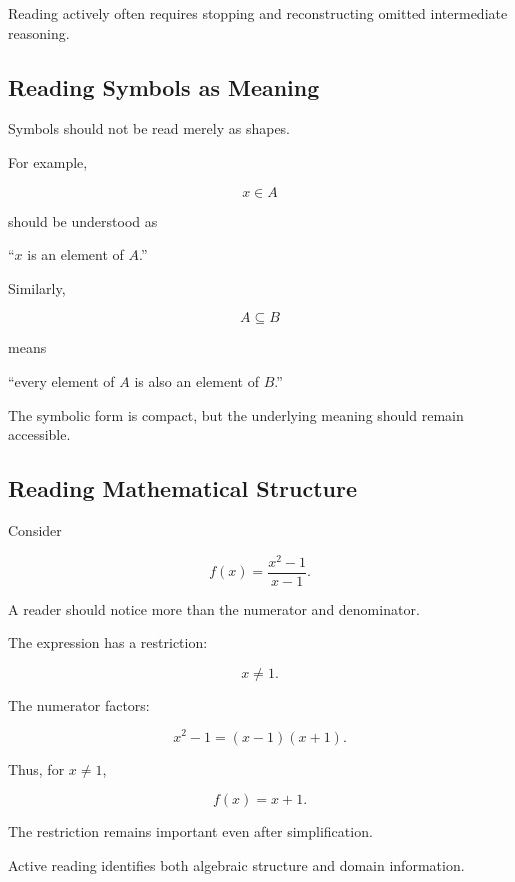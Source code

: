 Reading actively often requires stopping and reconstructing omitted
intermediate reasoning.

\subsection{Reading Symbols as Meaning}
\label{subsec:reading-symbols-as-meaning}

Symbols should not be read merely as shapes.

For example,

\[ x\in A \]

should be understood as

\begin{center}
``\(x\) is an element of \(A\).''
\end{center}

Similarly,

\[ A\subseteq B \]

means

\begin{center}
``every element of \(A\) is also an element of \(B\).''
\end{center}

The symbolic form is compact, but the underlying meaning should remain
accessible.

\subsection{Reading Mathematical Structure}
\label{subsec:reading-mathematical-structure}

Consider

\[ f(x)=\frac{x^2-1}{x-1}. \]

A reader should notice more than the numerator and denominator.

The expression has a restriction:

\[ x\neq1. \]

The numerator factors:

\[ x^2-1=(x-1)(x+1). \]

Thus, for \(x\neq1\),

\[ f(x)=x+1. \]

The restriction remains important even after simplification.

Active reading identifies both algebraic structure and domain information.

